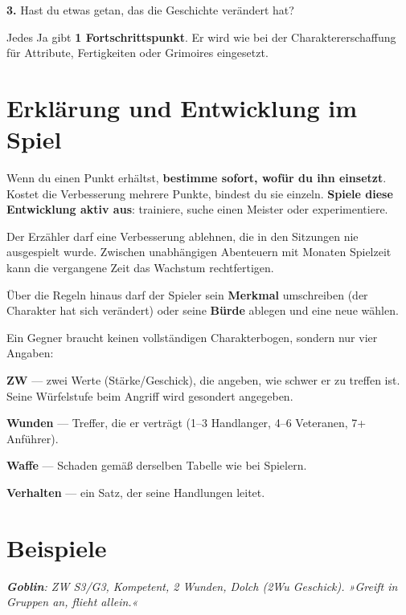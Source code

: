 \documentclass[10pt,a4paper]{article}
\begin{document}
\textbf{3.} Hast du etwas getan, das die Geschichte verändert hat?

Jedes Ja gibt \textbf{1 Fortschrittspunkt}. Er wird wie bei der Charaktererschaffung für Attribute, Fertigkeiten oder Grimoires eingesetzt.

\section*{Erklärung und Entwicklung im Spiel}
Wenn du einen Punkt erhältst, \textbf{bestimme sofort, wofür du ihn einsetzt}. Kostet die Verbesserung mehrere Punkte, bindest du sie einzeln. \textbf{Spiele diese Entwicklung aktiv aus}: trainiere, suche einen Meister oder experimentiere.

Der Erzähler darf eine Verbesserung ablehnen, die in den Sitzungen nie ausgespielt wurde. Zwischen unabhängigen Abenteuern mit Monaten Spielzeit kann die vergangene Zeit das Wachstum rechtfertigen.

Über die Regeln hinaus darf der Spieler sein \textbf{Merkmal} umschreiben (der Charakter hat sich verändert) oder seine \textbf{Bürde} ablegen und eine neue wählen.

Ein Gegner braucht keinen vollständigen Charakterbogen, sondern nur vier Angaben:

\textbf{ZW} — zwei Werte (Stärke/Geschick), die angeben, wie schwer er zu treffen ist. Seine Würfelstufe beim Angriff wird gesondert angegeben.

\textbf{Wunden} — Treffer, die er verträgt (1–3 Handlanger, 4–6 Veteranen, 7+ Anführer).

\textbf{Waffe} — Schaden gemäß derselben Tabelle wie bei Spielern.

\textbf{Verhalten} — ein Satz, der seine Handlungen leitet.

\section*{Beispiele}
\textbf{\textit{Goblin}}\textit{: ZW S3/G3, Kompetent, 2 Wunden, Dolch (2Wu Geschick). »Greift in Gruppen an, flieht allein.«}
\end{document}
